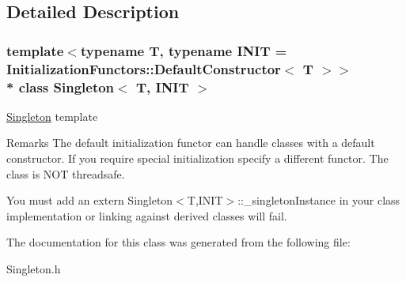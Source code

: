 \subsection{Detailed Description}
\subsubsection*{template$<$typename T, typename I\+N\+IT = Initialization\+Functors\+::\+Default\+Constructor$<$ T $>$$>$\\*
class Singleton$<$ T, I\+N\+I\+T $>$}

\hyperlink{classSingleton}{Singleton} template

\begin{DoxyRemark}{Remarks}
The default initialization functor can handle classes with a default constructor. If you require special initialization specify a different functor. The class is N\+OT threadsafe.

You must add an extern Singleton$<$\+T,\+I\+N\+I\+T$>$\+::\+\_\+singleton\+Instance in your class implementation or linking against derived classes will fail. 
\end{DoxyRemark}


The documentation for this class was generated from the following file\+:\begin{DoxyCompactItemize}
\item 
Singleton.\+h\end{DoxyCompactItemize}

